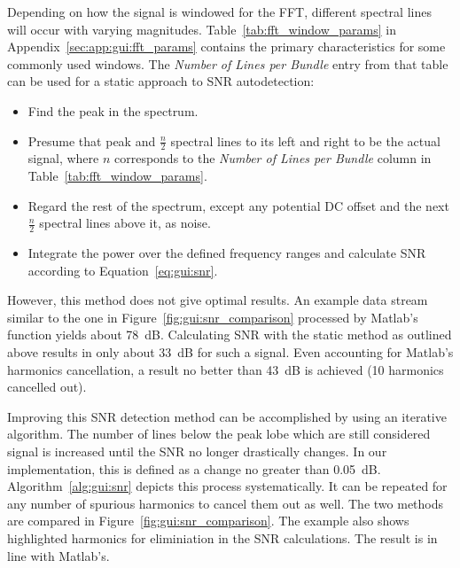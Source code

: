 Depending  on how  the  signal is  windowed for  the  FFT, different  spectral
lines will occur with varying magnitudes. Table~\ref{tab:fft_window_params} in
Appendix~\ref{sec:app:gui:fft_params} contains the primary characteristics for
some commonly used  windows. The \emph{Number of Lines per  Bundle} entry from
that table can be used for a static approach to SNR autodetection:
\begin{itemize}\tightlist
    \item
        Find the peak in the spectrum.
    \item
        Presume   that  peak   and   $\frac{n}{2}$  spectral   lines  to   its
        left   and    right   to   be    the   actual   signal,    where   $n$
        corresponds  to  the  \emph{Number  of Lines  per  Bundle}  column  in
        Table~\ref{tab:fft_window_params}.
    \item
        Regard the  rest of the spectrum,  except any potential DC  offset and
        the next $\frac{n}{2}$ spectral lines above it, as noise.
    \item
        Integrate the  power over the  defined frequency ranges  and calculate
        SNR according to Equation~\ref{eq:gui:snr}.
\end{itemize}
However, this  method does  not give optimal  results. An example  data stream
similar  to  the  one   in  Figure~\ref{fig:gui:snr_comparison}  processed  by
Matlab's  function yields about \SI{78}{\dB}. Calculating SNR with
the static  method as outlined  above results  in only about  \SI{33}{\dB} for
such a signal.  Even accounting  for Matlab's harmonics cancellation, a result
no better than \SI{43}{\dB} is achieved (\num{10} harmonics cancelled out).

Improving  this  SNR  detection  method   can  be  accomplished  by  using  an
iterative  algorithm. The   number  of  lines   below  the  peak   lobe  which
are  still   considered  signal   is  increased  until   the  SNR   no  longer
drastically  changes. In  our implementation,  this  is  defined as  a  change
no  greater  than   \SI{0.05}{\dB}. Algorithm~\ref{alg:gui:snr}  depicts  this
process  systematically.   It can  be  repeated  for  any number  of  spurious
harmonics  to  cancel   them  out  as  well. The  two   methods  are  compared
in  Figure~\ref{fig:gui:snr_comparison}. The  example also  shows  highlighted
harmonics for eliminiation in the SNR calculations. The result is in line with
Matlab's.


